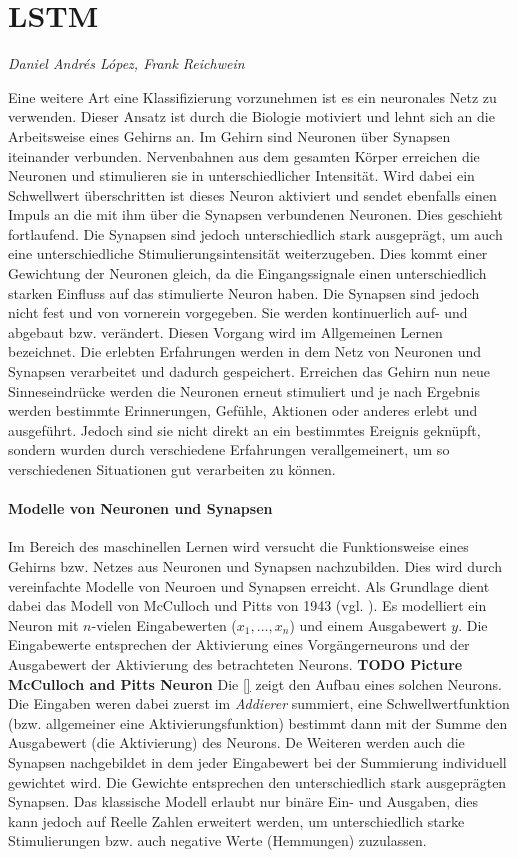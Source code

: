 \section{\acl{LSTM}}
\textit{Daniel Andrés López, Frank Reichwein}

Eine weitere Art eine Klassifizierung vorzunehmen ist es ein neuronales Netz zu
verwenden. Dieser Ansatz ist durch die Biologie motiviert und lehnt sich an die
Arbeitsweise eines Gehirns an. Im Gehirn sind Neuronen über Synapsen iteinander
verbunden. Nervenbahnen aus dem gesamten Körper erreichen die Neuronen und
stimulieren sie in unterschiedlicher Intensität. Wird dabei ein Schwellwert
überschritten ist dieses Neuron aktiviert und sendet ebenfalls einen Impuls an
die mit ihm über die Synapsen verbundenen Neuronen. Dies geschieht fortlaufend.
Die Synapsen sind jedoch unterschiedlich stark ausgeprägt, um auch eine
unterschiedliche Stimulierungsintensität weiterzugeben. Dies kommt einer
Gewichtung der Neuronen gleich, da die Eingangssignale einen unterschiedlich
starken Einfluss auf das stimulierte Neuron haben. Die Synapsen sind jedoch
nicht fest und von vornerein vorgegeben. Sie werden kontinuerlich auf- und
abgebaut bzw. verändert. Diesen Vorgang wird im Allgemeinen Lernen bezeichnet.
Die erlebten Erfahrungen werden in dem Netz von Neuronen und Synapsen
verarbeitet und dadurch gespeichert. Erreichen das Gehirn nun neue
Sinneseindrücke werden die Neuronen erneut stimuliert und je nach Ergebnis
werden bestimmte Erinnerungen, Gefühle, Aktionen oder anderes erlebt und
ausgeführt. Jedoch sind sie nicht direkt an ein bestimmtes Ereignis geknüpft,
sondern wurden durch verschiedene Erfahrungen verallgemeinert, um so
verschiedenen Situationen gut verarbeiten zu können. 

\paragraph{Modelle von Neuronen und Synapsen}
Im Bereich des maschinellen Lernen wird versucht die Funktionsweise eines
Gehirns bzw. Netzes aus Neuronen und Synapsen nachzubilden. Dies wird durch
vereinfachte Modelle von Neuroen und Synapsen erreicht. Als Grundlage dient
dabei das Modell von McCulloch und Pitts von 1943 (vgl. \cite{Mcc43}). Es
modelliert ein Neuron mit $n$-vielen Eingabewerten ($x_1,\ldots,x_n$) und einem
Ausgabewert $y$. Die Eingabewerte entsprechen der Aktivierung eines
Vorgängerneurons und der Ausgabewert der Aktivierung des betrachteten Neurons.
\textbf{TODO Picture McCulloch and Pitts Neuron} Die \autoref{} zeigt den Aufbau
eines solchen Neurons. Die Eingaben weren dabei zuerst im \textit{Addierer}
summiert, eine Schwellwertfunktion (bzw. allgemeiner eine Aktivierungsfunktion)
bestimmt dann mit der Summe den Ausgabewert (die Aktivierung) des Neurons. De Weiteren
werden auch die Synapsen nachgebildet in dem jeder Eingabewert bei der
Summierung individuell gewichtet wird. Die Gewichte entsprechen den
unterschiedlich stark ausgeprägten Synapsen. Das klassische Modell erlaubt nur
binäre Ein- und Ausgaben, dies kann jedoch auf Reelle Zahlen erweitert werden,
um unterschiedlich starke Stimulierungen bzw. auch negative Werte (Hemmungen)
zuzulassen.

